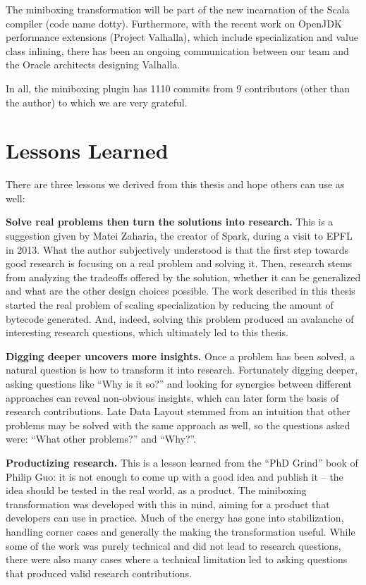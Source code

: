 The miniboxing transformation will be part of the new incarnation of the Scala compiler (code name dotty). Furthermore, with the recent work on OpenJDK performance extensions (Project Valhalla\cite{goetz-specialization,valhalla-model2-announcement,valhalla-model2-implementation}), which include specialization and value class inlining, there has been an ongoing communication between our team and the Oracle architects designing Valhalla.

In all, the miniboxing plugin has 1110 commits from 9 contributors (other than the author) to which we are very grateful.

\section{Lessons Learned}

There are three lessons we derived from this thesis and hope others can use as well:

\textbf{Solve real problems then turn the solutions into research.} This is a suggestion given by Matei Zaharia, the creator of Spark, during a visit to EPFL in 2013. What the author subjectively understood is that the first step towards good research is focusing on a real problem and solving it. Then, research stems from analyzing the tradeoffs offered by the solution, whether it can be generalized and what are the other design choices possible. The work described in this thesis started the real problem of scaling specialization by reducing the amount of bytecode generated. And, indeed, solving this problem produced an avalanche of interesting research questions, which ultimately led to this thesis.

\textbf{Digging deeper uncovers more insights.} Once a problem has been solved, a natural question is how to transform it into research. Fortunately digging deeper, asking questions like ``Why is it so?'' and looking for synergies between different approaches can reveal non-obvious insights, which can later form the basis of research contributions. Late Data Layout stemmed from an intuition that other problems may be solved with the same approach as well, so the questions asked were: ``What other problems?'' and ``Why?''.

\textbf{Productizing research.} This is a lesson learned from the ``PhD Grind'' book of Philip Guo: it is not enough to come up with a good idea and publish it -- the idea should be tested in the real world, as a product. The miniboxing transformation was developed with this in mind, aiming for a product that developers can use in practice. Much of the energy has gone into stabilization, handling corner cases and generally the making the transformation useful. While some of the work was purely technical and did not lead to research questions, there were also many cases where a technical limitation led to asking questions that produced valid research contributions.
